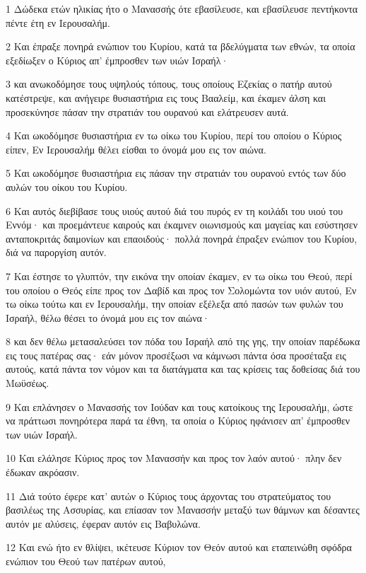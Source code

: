\par 1 Δώδεκα ετών ηλικίας ήτο ο Μανασσής ότε εβασίλευσε, και εβασίλευσε πεντήκοντα πέντε έτη εν Ιερουσαλήμ.
\par 2 Και έπραξε πονηρά ενώπιον του Κυρίου, κατά τα βδελύγματα των εθνών, τα οποία εξεδίωξεν ο Κύριος απ' έμπροσθεν των υιών Ισραήλ·
\par 3 και ανωκοδόμησε τους υψηλούς τόπους, τους οποίους Εζεκίας ο πατήρ αυτού κατέστρεψε, και ανήγειρε θυσιαστήρια εις τους Βααλείμ, και έκαμεν άλση και προσεκύνησε πάσαν την στρατιάν του ουρανού και ελάτρευσεν αυτά.
\par 4 Και ωκοδόμησε θυσιαστήρια εν τω οίκω του Κυρίου, περί του οποίου ο Κύριος είπεν, Εν Ιερουσαλήμ θέλει είσθαι το όνομά μου εις τον αιώνα.
\par 5 Και ωκοδόμησε θυσιαστήρια εις πάσαν την στρατιάν του ουρανού εντός των δύο αυλών του οίκου του Κυρίου.
\par 6 Και αυτός διεβίβασε τους υιούς αυτού διά του πυρός εν τη κοιλάδι του υιού του Εννόμ· και προεμάντευε καιρούς και έκαμνεν οιωνισμούς και μαγείας και εσύστησεν ανταποκριτάς δαιμονίων και επαοιδούς· πολλά πονηρά έπραξεν ενώπιον του Κυρίου, διά να παροργίση αυτόν.
\par 7 Και έστησε το γλυπτόν, την εικόνα την οποίαν έκαμεν, εν τω οίκω του Θεού, περί του οποίου ο Θεός είπε προς τον Δαβίδ και προς τον Σολομώντα τον υιόν αυτού, Εν τω οίκω τούτω και εν Ιερουσαλήμ, την οποίαν εξέλεξα από πασών των φυλών του Ισραήλ, θέλω θέσει το όνομά μου εις τον αιώνα·
\par 8 και δεν θέλω μετασαλεύσει τον πόδα του Ισραήλ από της γης, την οποίαν παρέδωκα εις τους πατέρας σας· εάν μόνον προσέξωσι να κάμνωσι πάντα όσα προσέταξα εις αυτούς, κατά πάντα τον νόμον και τα διατάγματα και τας κρίσεις τας δοθείσας διά του Μωϋσέως.
\par 9 Και επλάνησεν ο Μανασσής τον Ιούδαν και τους κατοίκους της Ιερουσαλήμ, ώστε να πράττωσι πονηρότερα παρά τα έθνη, τα οποία ο Κύριος ηφάνισεν απ' έμπροσθεν των υιών Ισραήλ.
\par 10 Και ελάλησε Κύριος προς τον Μανασσήν και προς τον λαόν αυτού· πλην δεν έδωκαν ακρόασιν.
\par 11 Διά τούτο έφερε κατ' αυτών ο Κύριος τους άρχοντας του στρατεύματος του βασιλέως της Ασσυρίας, και επίασαν τον Μανασσήν μεταξύ των θάμνων και δέσαντες αυτόν με αλύσεις, έφεραν αυτόν εις Βαβυλώνα.
\par 12 Και ενώ ήτο εν θλίψει, ικέτευσε Κύριον τον Θεόν αυτού και εταπεινώθη σφόδρα ενώπιον του Θεού των πατέρων αυτού,
